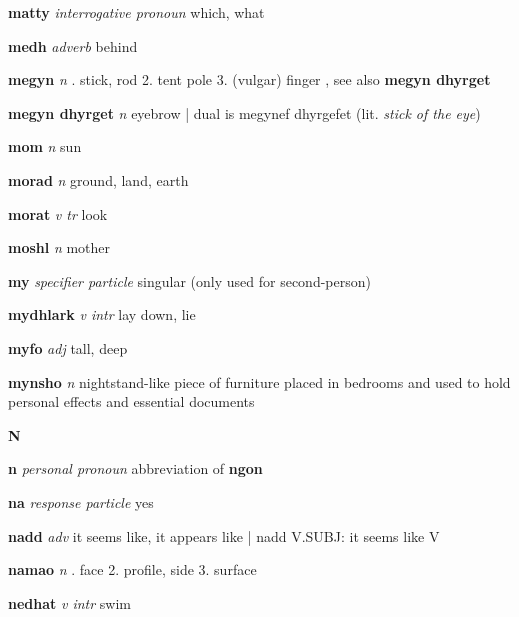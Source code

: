 \textbf{matty}   \emph{interrogative pronoun} \textperiodcentered which, what

\textbf{medh}   \emph{adverb} \textperiodcentered behind

\textbf{megyn}   \emph{n} . stick, rod 2. tent pole 3. (vulgar) finger , see also \textbf{megyn dhyrget}

\textbf{megyn dhyrget}   \emph{n} \textperiodcentered eyebrow | dual is megynef dhyrgefet (lit. \emph{stick of the eye})

\textbf{mom}   \emph{n} \textperiodcentered sun

\textbf{morad}   \emph{n} \textperiodcentered ground, land, earth

\textbf{morat}   \emph{v tr} \textperiodcentered look

\textbf{moshl}   \emph{n} \textperiodcentered mother

\textbf{my}   \emph{specifier particle} \textperiodcentered singular (only used for second-person)

\textbf{mydhlark}   \emph{v intr} \textperiodcentered lay down, lie

\textbf{myfo}   \emph{adj} \textperiodcentered tall, deep

\textbf{mynsho}   \emph{n} \textperiodcentered nightstand-like piece of furniture placed in bedrooms and used to hold personal effects and essential documents

\begin{center} \Huge \bfseries N \end{center}\textbf{n}   \emph{personal pronoun} \textperiodcentered abbreviation of \textbf{ngon}

\textbf{na}   \emph{response particle} \textperiodcentered yes

\textbf{nadd}   \emph{adv} \textperiodcentered it seems like, it appears like | nadd V.SUBJ: it seems like V

\textbf{namao}   \emph{n} . face 2. profile, side 3. surface 

\textbf{nedhat}   \emph{v intr} \textperiodcentered swim

